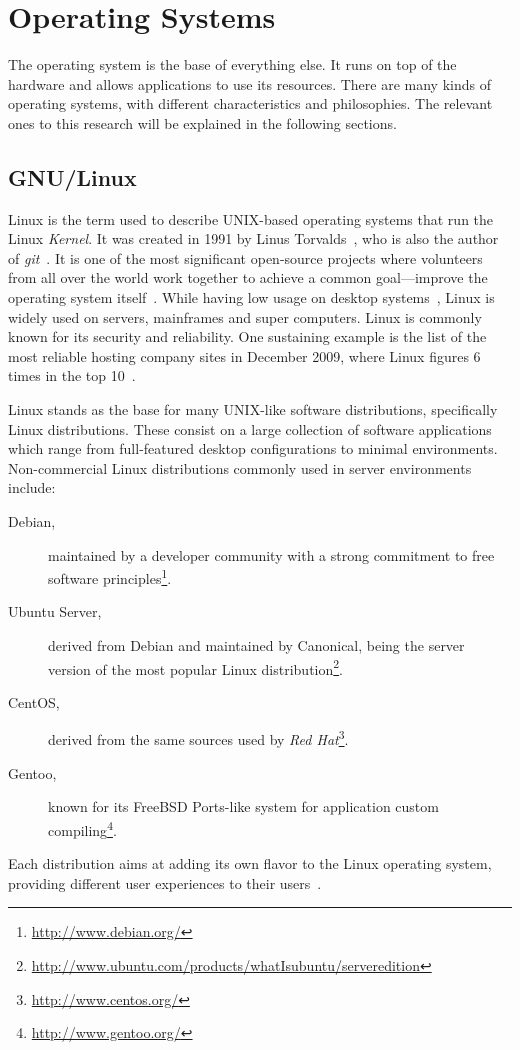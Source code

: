 \section{Operating Systems}
\label{tech:sec:operating_systems}
The operating system is the base of everything else. It runs on top of the hardware and allows applications to use its resources. There are many kinds of operating systems, with different characteristics and philosophies. The relevant ones to this research will be explained in the following sections.

\subsection{GNU/Linux}
Linux is the term used to describe UNIX-based operating systems that run the Linux \textit{Kernel}. It was created in 1991 by Linus Torvalds~\cite{linux_kernel_evolution}, who is also the author of \textit{git}~\cite{pro_git}. It is one of the most significant open-source projects where volunteers from all over the world work together to achieve a common goal---improve the operating system itself~\cite{linux_kernel_evolution}. While having low usage on desktop systems~\cite{w3counter}, Linux is widely used on servers, mainframes and super computers. Linux is commonly known for its security and reliability. One sustaining example is the list of the most reliable hosting company sites in December 2009, where Linux figures 6 times in the top 10~\cite{netcraft_dec2009}.

Linux stands as the base for many UNIX-like software distributions, specifically Linux distributions. These consist on a large collection of software applications which range from full-featured desktop configurations to minimal environments. Non-commercial Linux distributions commonly used in server environments include:
\begin {description}
\item[Debian,] maintained by a developer community with a strong commitment to free software principles\footnote{\url{http://www.debian.org/}}.
\item[Ubuntu Server,] derived from Debian and maintained by Canonical, being the server version of the most popular Linux distribution\footnote{\url{http://www.ubuntu.com/products/whatIsubuntu/serveredition}}.
\item[CentOS,] derived from the same sources used by \textit{Red Hat}\footnote{\url{http://www.centos.org/}}.
\item[Gentoo,] known for its FreeBSD Ports-like system for application custom compiling\footnote{\url{http://www.gentoo.org/}}.
\end{description}
Each distribution aims at adding its own flavor to the Linux operating system, providing different user experiences to their users~\cite{tuning_costumizing_linux}.


